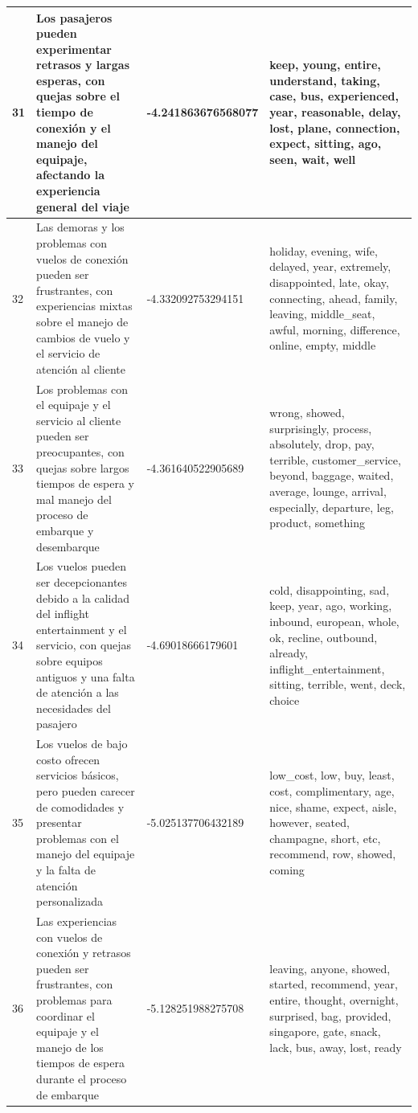 \documentclass{report}
\begin{document}
{{\begin{longtable}{|p{1cm}|p{4cm}|p{4cm}|p{6cm}|}
                    \hline
                    31 & Los pasajeros pueden experimentar retrasos y largas esperas, con quejas sobre el tiempo de conexión y el manejo del equipaje, afectando la experiencia general del viaje & -4.241863676568077 & keep, young, entire, understand, taking, case, bus, experienced, year, reasonable, delay, lost, plane, connection, expect, sitting, ago, seen, wait, well \\
                    \hline
                    32 & Las demoras y los problemas con vuelos de conexión pueden ser frustrantes, con experiencias mixtas sobre el manejo de cambios de vuelo y el servicio de atención al cliente & -4.332092753294151 & holiday, evening, wife, delayed, year, extremely, disappointed, late, okay, connecting, ahead, family, leaving, middle\_seat, awful, morning, difference, online, empty, middle \\
                    \hline
                    33 & Los problemas con el equipaje y el servicio al cliente pueden ser preocupantes, con quejas sobre largos tiempos de espera y mal manejo del proceso de embarque y desembarque & -4.361640522905689 & wrong, showed, surprisingly, process, absolutely, drop, pay, terrible, customer\_service, beyond, baggage, waited, average, lounge, arrival, especially, departure, leg, product, something \\
                    \hline
                    34 & Los vuelos pueden ser decepcionantes debido a la calidad del inflight entertainment y el servicio, con quejas sobre equipos antiguos y una falta de atención a las necesidades del pasajero & -4.69018666179601 & cold, disappointing, sad, keep, year, ago, working, inbound, european, whole, ok, recline, outbound, already, inflight\_entertainment, sitting, terrible, went, deck, choice \\
                    \hline
                    35 & Los vuelos de bajo costo ofrecen servicios básicos, pero pueden carecer de comodidades y presentar problemas con el manejo del equipaje y la falta de atención personalizada & -5.025137706432189 & low\_cost, low, buy, least, cost, complimentary, age, nice, shame, expect, aisle, however, seated, champagne, short, etc, recommend, row, showed, coming \\
                    \hline
                    36 & Las experiencias con vuelos de conexión y retrasos pueden ser frustrantes, con problemas para coordinar el equipaje y el manejo de los tiempos de espera durante el proceso de embarque & -5.128251988275708 & leaving, anyone, showed, started, recommend, year, entire, thought, overnight, surprised, bag, provided, singapore, gate, snack, lack, bus, away, lost, ready \\

\end{longtable}}}
\end{document}
